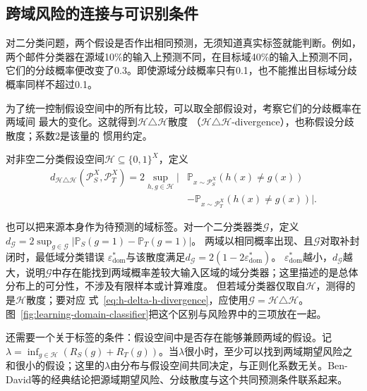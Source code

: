 \subsection{跨域风险的连接与可识别条件}
\label{sec:adaptation-risk}

对二分类问题，两个假设是否作出相同预测，无须知道真实标签就能判断。例如，两个邮件分类器在源域10\%的输入上预测不同，在目标域40\%的输入上预测不同，它们的分歧概率便改变了0.3。即使源域分歧概率只有0.1，也不能推出目标域分歧概率同样不超过0.1。

为了统一控制假设空间中的所有比较，可以取全部假设对，考察它们的分歧概率在两域间
最大的变化。这就得到$\mathcal H\triangle\mathcal H$散度
（$\mathcal H\triangle\mathcal H$-divergence），也称假设分歧散度；系数2是该量的
惯用约定。

\begin{definition}[假设分歧散度]
\label{def:h-delta-h-divergence}
对非空二分类假设空间$\mathcal H\subseteq\{0,1\}^{X}$，定义
\begin{equation}
 \begin{aligned}
 d_{\mathcal H\triangle\mathcal H}(\mathcal P_S^X,\mathcal P_T^X)
 =2\sup_{h,g\in\mathcal H}
 \big|&\mathbb P_{x\sim\mathcal P_S^X}(h(x)\neq g(x))\\
       &-\mathbb P_{x\sim\mathcal P_T^X}(h(x)\neq g(x))\big|.
 \end{aligned}
 \label{eq:h-delta-h-divergence}
\end{equation}
\end{definition}

也可以把来源本身作为待预测的域标签。对一个二分类器类$\mathcal G$，定义
$d_{\mathcal G}=2\sup_{g\in\mathcal G}|\mathbb P_S(g=1)-\mathbb P_T(g=1)|$。
两域以相同概率出现、且$\mathcal G$对取补封闭时，最低域分类错误
$\varepsilon_{\mathrm{dom}}^*$与该散度满足$d_{\mathcal G}=2(1-2\varepsilon_{\mathrm{dom}}^*)$。
$\varepsilon_{\mathrm{dom}}^*$越小，$d_{\mathcal G}$越大，说明$\mathcal G$中存在能找到两域概率差较大输入区域的域分类器；这里描述的是总体分布上的可分性，不涉及有限样本或计算难度。
但若域分类器仅取自$\mathcal H$，测得的是$\mathcal H$散度；要对应
式~\eqref{eq:h-delta-h-divergence}，应使用$\mathcal G=\mathcal H\triangle\mathcal H$。
图~\ref{fig:learning-domain-classifier}把这个区别与风险界中的三项放在一起。

还需要一个关于标签的条件：假设空间中是否存在能够兼顾两域的假设。记
$\lambda=\inf_{g\in\mathcal H}(R_S(g)+R_T(g))$。当$\lambda$很小时，至少可以找到两域期望风险之和很小的假设；这里的$\lambda$由分布与假设空间共同决定，与正则化系数无关。Ben-David等的经典结论把源域期望风险、分歧散度与这个共同预测条件联系起来。

